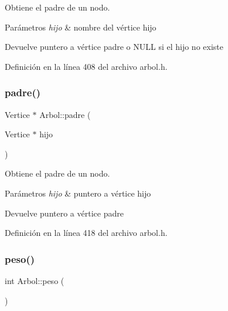 Obtiene el padre de un nodo. 


\begin{DoxyParams}{Parámetros}
{\em hijo} & nombre del vértice hijo \\
\hline
\end{DoxyParams}
\begin{DoxyReturn}{Devuelve}
puntero a vértice padre o N\+U\+LL si el hijo no existe 
\end{DoxyReturn}


Definición en la línea 408 del archivo arbol.\+h.

\mbox{\label{classArbol_a3395234bc7b7a91d2880e10367039284}} 
\subsubsection{\texorpdfstring{padre()}{padre()}\hspace{0.1cm}{\footnotesize\ttfamily [3/3]}}
{\footnotesize\ttfamily Vertice $\ast$ Arbol\+::padre (\begin{DoxyParamCaption}\item[{Vertice $\ast$}]{hijo }\end{DoxyParamCaption})}



Obtiene el padre de un nodo. 


\begin{DoxyParams}{Parámetros}
{\em hijo} & puntero a vértice hijo \\
\hline
\end{DoxyParams}
\begin{DoxyReturn}{Devuelve}
puntero a vértice padre 
\end{DoxyReturn}


Definición en la línea 418 del archivo arbol.\+h.

\mbox{\label{classArbol_a9051a6b4120b42ff8d046f41ab73dbaa}} 
\subsubsection{\texorpdfstring{peso()}{peso()}}
{\footnotesize\ttfamily int Arbol\+::peso (\begin{DoxyParamCaption}{ }\end{DoxyParamCaption})}



